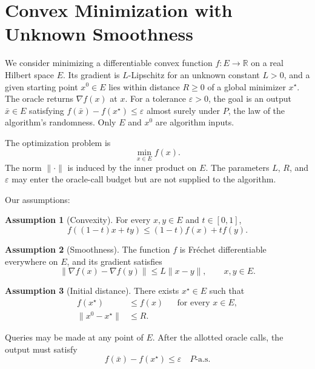 \documentclass[10pt]{article}
\theoremstyle{definition}
\newtheorem{assumption}{Assumption}
\begin{document}
\section*{Convex Minimization with Unknown Smoothness}
We consider minimizing a differentiable convex function $f:E\to\mathbb{R}$ on a real Hilbert space $E$. Its gradient is $L$-Lipschitz for an unknown constant $L>0$, and a given starting point $x^0\in E$ lies within distance $R\geq 0$ of a global minimizer $x^\star$. The oracle returns $\nabla f(x)$ at $x$. For a tolerance $\varepsilon>0$, the goal is an output $\bar{x}\in E$ satisfying $f(\bar{x})-f(x^\star)\leq\varepsilon$ almost surely under $P$, the law of the algorithm's randomness. Only $E$ and $x^0$ are algorithm inputs.

The optimization problem is
\[
\min_{x\in E} f(x).
\]
The norm $\|\cdot\|$ is induced by the inner product on $E$. The parameters $L$, $R$, and $\varepsilon$ may enter the oracle-call budget but are not supplied to the algorithm.

Our assumptions:
\begin{assumption}[Convexity]
For every $x,y\in E$ and $t\in[0,1]$,
\[
f((1-t)x+ty)\leq (1-t)f(x)+t f(y).
\]
\end{assumption}

\begin{assumption}[Smoothness]
The function $f$ is Fr\'echet differentiable everywhere on $E$, and its gradient satisfies
\[
\|\nabla f(x)-\nabla f(y)\|\leq L\|x-y\|,
\qquad x,y\in E.
\]
\end{assumption}

\begin{assumption}[Initial distance]
There exists $x^\star\in E$ such that
\[
\begin{aligned}
f(x^\star)&\leq f(x) &&\text{for every }x\in E,\\
\|x^0-x^\star\|&\leq R.
\end{aligned}
\]
\end{assumption}

Queries may be made at any point of $E$. After the allotted oracle calls, the output must satisfy
\[
f(\bar{x})-f(x^\star)\leq\varepsilon
\quad P\text{-a.s.}
\]
\end{document}
